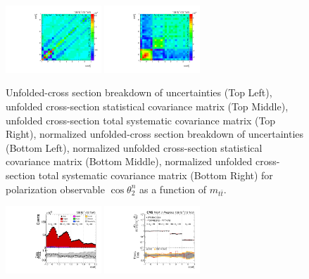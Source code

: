 \begin{refsection}
\begin{figure}[htb]
\begin{center}
 \includegraphics[width=0.32\textwidth]{fig_fullRun2UL/unfolding/combined/StatCovMatrixNorm_rebinnedB_b2n_mttbar.pdf}
 \includegraphics[width=0.32\textwidth]{fig_fullRun2UL/unfolding/combined/TotalSystCovMatrixNorm_rebinnedB_b2n_mttbar.pdf} \\
\caption{Unfolded-cross section breakdown of uncertainties (Top Left), unfolded cross-section statistical covariance matrix (Top Middle), unfolded cross-section total systematic covariance matrix (Top Right), normalized unfolded-cross section breakdown of uncertainties (Bottom Left), normalized unfolded cross-section statistical covariance matrix (Bottom Middle), normalized unfolded cross-section total systematic covariance matrix (Bottom Right) for polarization observable $\cos\theta_{2}^{n}$ as a function of $m_{t\bar{t}}$.}
\label{fig:b2n_mttbar_uncertainties}
\end{center}
\end{figure}
\clearpage
\begin{figure}[htb]
\begin{center}
 \includegraphics[width=0.32\textwidth]{fig_fullRun2UL/controlplots/combined/Hyp_AntiLeptonBr_vs_TTBarMass.pdf}
 \includegraphics[width=0.32\textwidth]{fig_fullRun2UL/unfolding/combined/UnfoldedResults_b1r_mttbar.pdf}

\end{center}
\end{figure}
\end{refsection}
